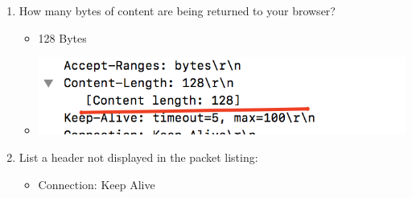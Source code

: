 \documentclass{article}
\begin{document}
\begin{enumerate}
\begin{itemize}
        \end{itemize}
      \item How many bytes of content are being returned to your browser?
        \begin{itemize}
          \item 128 Bytes
          \item \includegraphics[scale=0.5]{images/HTTP6.png}
        \end{itemize}
      \item List a header not displayed in the packet listing:
        \begin{itemize}
          \item Connection: Keep Alive
        \end{itemize} 
    \end{enumerate}

  
\end{document}
